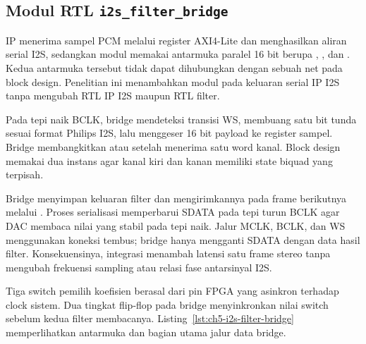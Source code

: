 \subsection{Modul RTL \texttt{i2s\_filter\_bridge}}

IP  menerima sampel PCM melalui register AXI4-Lite dan menghasilkan aliran serial I2S, sedangkan modul  memakai antarmuka paralel 16 bit berupa , , dan . Kedua antarmuka tersebut tidak dapat dihubungkan dengan sebuah net pada block design. Penelitian ini menambahkan modul  pada keluaran serial IP I2S tanpa mengubah RTL IP I2S maupun RTL filter.

Pada tepi naik BCLK, bridge mendeteksi transisi WS, membuang satu bit tunda sesuai format Philips I2S, lalu menggeser 16 bit payload ke register sampel. Bridge membangkitkan  atau  setelah menerima satu word kanal. Block design memakai dua instans  agar kanal kiri dan kanan memiliki state biquad yang terpisah.

Bridge menyimpan keluaran filter dan mengirimkannya pada frame berikutnya melalui . Proses serialisasi memperbarui SDATA pada tepi turun BCLK agar DAC membaca nilai yang stabil pada tepi naik. Jalur MCLK, BCLK, dan WS menggunakan koneksi tembus; bridge hanya mengganti SDATA dengan data hasil filter. Konsekuensinya, integrasi menambah latensi satu frame stereo tanpa mengubah frekuensi sampling atau relasi fase antarsinyal I2S.

Tiga switch pemilih koefisien berasal dari pin FPGA yang asinkron terhadap clock sistem. Dua tingkat flip-flop pada bridge menyinkronkan nilai switch sebelum kedua filter membacanya. Listing~\ref{lst:ch5-i2s-filter-bridge} memperlihatkan antarmuka dan bagian utama jalur data bridge.


